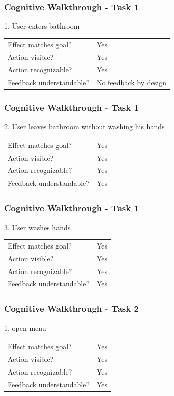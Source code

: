 \documentclass{beamer}
\begin{document}
\begin{frame}
  \frametitle{Cognitive Walkthrough - Task 1}
  1. User enters bathroom

  \begin{tabular}{ll}
    Effect matches goal?     & Yes \\
    Action visible?          & Yes \\
    Action recognizable?     & Yes \\
    Feedback understandable? & No feedback by design \\
  \end{tabular}
\end{frame}


\begin{frame}
  \frametitle{Cognitive Walkthrough - Task 1}
  2. User leaves bathroom without washing his hands 




  \begin{tabular}{ll}
    Effect matches goal?     & Yes \\
    Action visible?          & Yes \\
    Action recognizable?     & Yes \\
    Feedback understandable? & Yes \\
  \end{tabular}
\end{frame}

\begin{frame}
  \frametitle{Cognitive Walkthrough - Task 1}
  3. User washes hands 


  \begin{tabular}{ll}
    Effect matches goal?     & Yes \\
    Action visible?          & Yes \\
    Action recognizable?     & Yes \\
    Feedback understandable? & Yes \\
  \end{tabular}
\end{frame}

\begin{frame}
  \frametitle{Cognitive Walkthrough - Task 2}
  1. open menu 


  \begin{tabular}{ll}
    Effect matches goal?     & Yes \\
    Action visible?          & Yes \\
    Action recognizable?     & Yes \\
    Feedback understandable? & Yes \\
  \end{tabular}
\end{frame}
\end{document}
